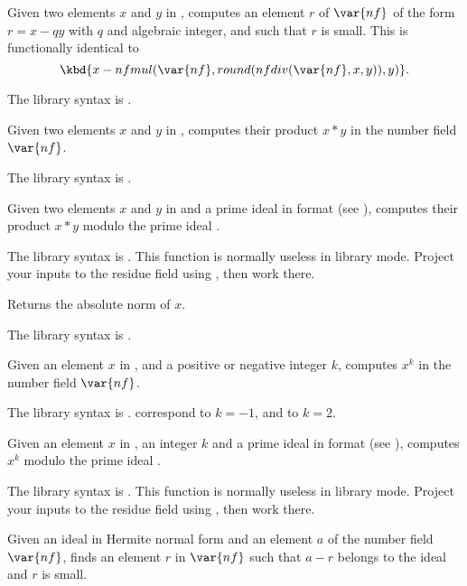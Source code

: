 \label{se:nfeltmod}
Given two elements $x$ and $y$ in
, computes an element $r$ of $\var{nf}$ of the form $r=x-qy$ with
$q$ and algebraic integer, and such that $r$ is small. This is functionally
identical to
$$\kbd{x - nfmul(\var{nf},round(nfdiv(\var{nf},x,y)),y)}.$$

The library syntax is .

\label{se:nfeltmul}
Given two elements $x$ and $y$ in
, computes their product $x*y$ in the number field $\var{nf}$.

The library syntax is .

\label{se:nfeltmulmodpr}
Given two elements $x$ and
$y$ in  and  a prime ideal in  format (see
), computes their product $x*y$ modulo the prime ideal
.

The library syntax is .
This function is normally useless in library mode. Project your
inputs to the residue field using , then work there.

\label{se:nfeltnorm}
Returns the absolute norm of $x$.

The library syntax is .

\label{se:nfeltpow}
Given an element $x$ in , and a positive or negative integer $k$,
computes $x^k$ in the number field $\var{nf}$.

The library syntax is .
 correspond to $k = -1$, and
 to $k = 2$.

\label{se:nfeltpowmodpr}
Given an element $x$ in , an integer $k$ and a prime ideal
 in  format
(see ), computes $x^k$ modulo the prime ideal .

The library syntax is .
This function is normally useless in library mode. Project your
inputs to the residue field using , then work there.

\label{se:nfeltreduce}
Given an ideal  in
Hermite normal form and an element $a$ of the number field $\var{nf}$,
finds an element $r$ in $\var{nf}$ such that $a-r$ belongs to the ideal
and $r$ is small.

